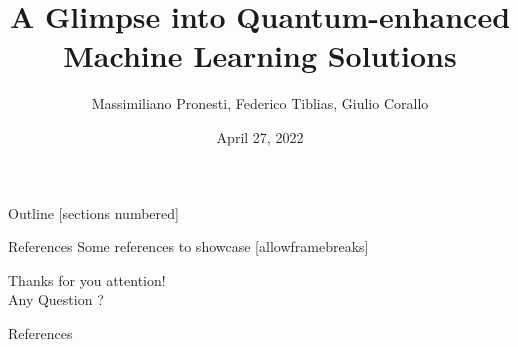 \documentclass[10pt]{beamer}
\title{A Glimpse into Quantum-enhanced Machine Learning Solutions}
\date{April 27, 2022}
\author{
	Massimiliano Pronesti, 
	Federico Tiblias, 
	Giulio Corallo
}
\institute{Amadeus Knowledge Sharing Session}
\begin{document}
	
	\maketitle
	
	
	
	\begin{frame}{Outline}
		[sections numbered]
		\tableofcontents
	\end{frame}
	
	    
    
	
	
	
	
	\begin{frame}{References}
		Some references to showcase [allowframebreaks] \cite{knuth92,ConcreteMath,Simpson,Er01,greenwade93}
	\end{frame}
	
    
	
	
	
	\begin{frame}[standout]
		Thanks for you attention!\\
		 Any Question ? ~\alert{\faSmileO}~
	\end{frame}
	
	
	\appendix
	
	\begin{frame}[allowframebreaks]{References}
		
		
	\end{frame}
	
\end{document}
